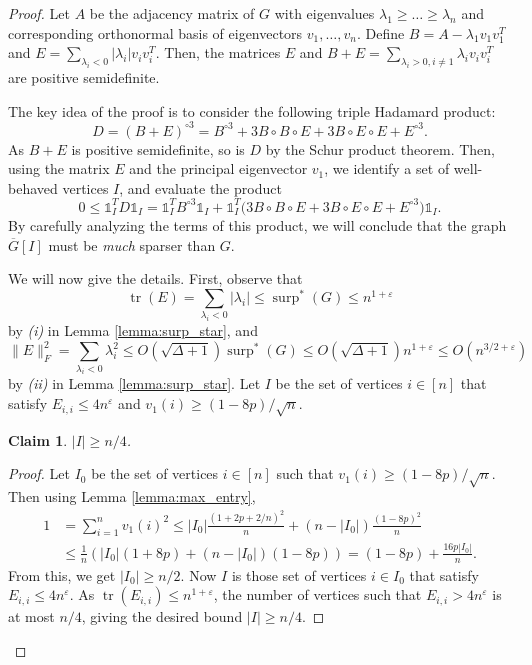 \documentclass[11pt]{article}
\theoremstyle{plain}
\newtheorem{claim}[theorem]{Claim}
\theoremstyle{definition}
\DeclareMathOperator{\surp}{surp}
\DeclareMathOperator{\trace}{tr}
\newcommand{\eps}{\varepsilon}
\begin{document}
\begin{proof}
Let $A$ be the adjacency matrix of $G$ with eigenvalues $\lambda_1\geq \dots\geq \lambda_n$ and corresponding orthonormal basis of eigenvectors $v_1,\dots,v_n$. Define $B=A-\lambda_1v_1v_1^T$ and $E=\sum_{\lambda_i<0}|\lambda_i| v_iv_i^T$. Then, the matrices $E$ and $B+E=\sum_{\lambda_i>0,i\neq 1}\lambda_i v_iv_i^T$ are positive semidefinite. 

The key idea of the proof is to consider the following triple Hadamard product:
$$D=(B+E)^{\circ 3}=B^{\circ 3}+3B\circ B\circ E+3B\circ E\circ E+E^{\circ 3}.$$
As $B+E$ is positive semidefinite, so is $D$ by the Schur product theorem. Then, using the matrix $E$ and the principal eigenvector $v_1$, we identify a set of well-behaved vertices $I$, and evaluate the product \[0\leq \mathds{1}_I^T D \mathds{1}_I= \mathds{1}_I^TB^{\circ 3}\mathds{1}_I+\mathds{1}_I^T\big(3B\circ B\circ E+3B\circ E\circ E+E^{\circ 3}\big) \mathds{1}_I.\]
By carefully analyzing the terms of this product, we will conclude that the graph $\overline{G}[I]$ must be \textit{much} sparser than $G$.

We will now give the details. First, observe that 
$$\trace(E)=\sum_{\lambda_i<0}|\lambda_i|\leq \surp^*(G)\leq n^{1+\eps}$$
by \textit{(i)} in Lemma \ref{lemma:surp_star}, and 
$$\|E\|_F^2=\sum_{\lambda_i<0}\lambda_i^2\leq O(\sqrt{\Delta+1})\surp^*(G)\leq O(\sqrt{\Delta+1}) n^{1+\eps}\leq O(n^{3/2+\eps})$$
by \textit{(ii)} in Lemma \ref{lemma:surp_star}. Let $I$ be the set of vertices $i\in [n]$ that satisfy $E_{i,i}\leq 4n^{\eps}$ and $v_1(i)\geq (1-8p)/\sqrt{n}$.
\begin{claim}
$|I|\geq n/4$.
\end{claim}
\begin{proof}
Let $I_0$ be the set of vertices $i\in [n]$ such that $v_1(i)\geq (1-8p)/\sqrt{n}.$ Then using Lemma \ref{lemma:max_entry},
\begin{align*}
    1&=\sum_{i=1}^nv_1(i)^2\leq |I_0|\frac{(1+2p+2/n)^2}{n}+(n-|I_0|)\frac{(1-8p)^2}{n}\\
    &\leq \frac{1}{n}\left(|I_0|(1+8p)+(n-|I_0|)(1-8p)\right)=(1-8p)+\frac{16p|I_0|}{n}.
\end{align*}
From this, we get $|I_0|\geq n/2$. Now $I$ is those set of vertices $i\in I_0$ that satisfy $E_{i,i}\leq 4n^{\eps}$. As $\trace(E_{i,i})\leq n^{1+\eps}$, the number of vertices such that $E_{i,i}>4n^{\eps}$ is at most $n/4$, giving the desired bound $|I|\geq n/4$. 
\end{proof}


\end{proof}
\end{document}
